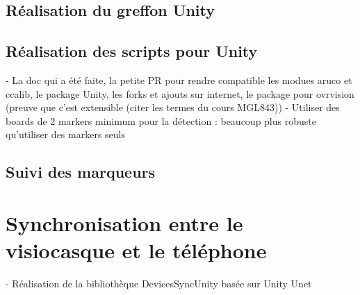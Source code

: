 \subsection{Réalisation du greffon Unity}



\subsection{Réalisation des scripts pour Unity}
- La doc qui a été faite, la petite PR pour rendre compatible les modues aruco et ccalib, le package Unity, les forks et ajouts sur internet, le package pour ovrvision (preuve que c'est extensible (citer les termes du cours MGL843))
- Utiliser des boards de 2 markers minimum pour la détection : beaucoup plus robuste qu'utiliser des markers seuls

\subsection{Suivi des marqueurs}


\section{Synchronisation entre le visiocasque et le téléphone}
\label{sec:synchronization}
- Réalisation de la bibliothèque DevicesSyncUnity basée sur Unity Unet


